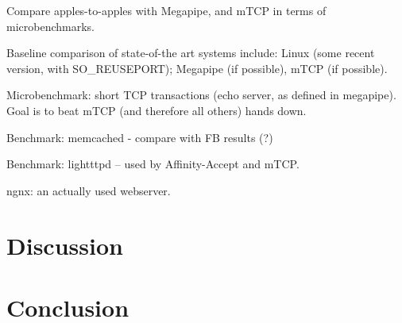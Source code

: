 \todo Compare apples-to-apples with Megapipe, and mTCP in terms of microbenchmarks.

\todo Baseline comparison of state-of-the art systems include:  Linux (some recent version, with SO\_REUSEPORT); Megapipe (if possible), mTCP (if possible). 

\todo Microbenchmark: short TCP transactions (echo server, as defined in megapipe).   Goal is to beat mTCP (and therefore all others) hands down.

\todo Benchmark: memcached - compare with FB results (?)

\todo Benchmark: lightttpd -- used by Affinity-Accept and mTCP.  

\todo ngnx: an actually used webserver.


\section{Discussion}
\section{Conclusion}




